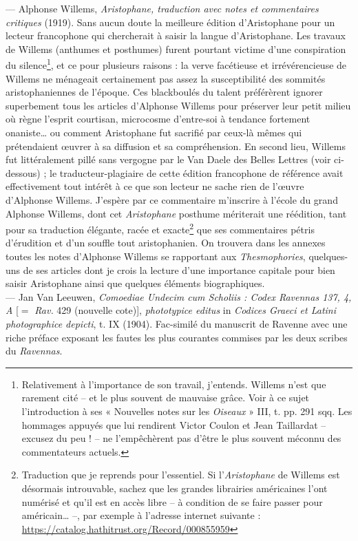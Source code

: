 \documentclass{book}%
\newcommand{\italique}[1]{\textit{#1}}%
\newcommand{\note}[1]{\footnote{#1}}
\begin{document}
--- Alphonse Willems, \italique{Aristophane, traduction avec notes et commentaires critiques} (1919). Sans aucun doute la meilleure édition d’Aristophane pour un lecteur francophone qui chercherait à saisir la langue d’Aristophane. Les travaux de Willems (anthumes et posthumes) furent pourtant victime d'une conspiration du silence\note{Relativement à l'importance de son travail, j'entends. Willems n'est que rarement cité -- et le plus souvent de mauvaise grâce. Voir à ce sujet l'introduction à ses « Nouvelles notes sur les \italique{Oiseaux} » III, t. pp. 291 sqq. Les hommages appuyés que lui rendirent Victor Coulon et Jean Taillardat -- excusez du peu ! -- ne l'empêchèrent pas d'être le plus souvent méconnu des commentateurs actuels.}, et ce pour plusieurs raisons : la verve facétieuse et irrévérencieuse de Willems ne ménageait certainement pas assez la susceptibilité des sommités aristophaniennes de l’époque. Ces blackboulés du talent préférèrent ignorer superbement tous les articles d’Alphonse Willems pour préserver leur petit milieu où règne l’esprit courtisan, microcosme d’entre-soi à tendance fortement onaniste… ou comment Aristophane fut sacrifié par ceux-là mêmes qui prétendaient œuvrer à sa diffusion et sa compréhension. En second lieu, Willems fut littéralement pillé sans vergogne par le Van Daele des Belles Lettres (voir ci-dessous) ; le traducteur-plagiaire de cette édition francophone de référence avait effectivement tout intérêt à ce que son lecteur ne sache rien de l’œuvre d’Alphonse Willems. J’espère par ce commentaire m’inscrire à l’école du grand Alphonse Willems, dont cet \italique{Aristophane} posthume mériterait une réédition, tant pour sa traduction élégante, racée et exacte\note{Traduction que je reprends pour l’essentiel. Si l’\italique{Aristophane} de Willems est désormais introuvable, sachez que les grandes librairies américaines l’ont numérisé et qu’il est en accès libre – à condition de se faire passer pour américain… –, par exemple à l’adresse internet suivante : \href{https://catalog.hathitrust.org/Record/000855959}{https://catalog.hathitrust.org/Record/000855959}} que ses commentaires pétris d’érudition et d’un souffle tout aristophanien. On trouvera dans les annexes toutes les notes d'Alphonse Willems se rapportant aux \italique{Thesmophories}, quelques-uns de ses articles dont je crois la lecture d'une importance capitale pour bien saisir Aristophane ainsi que quelques éléments biographiques.\\


--- Jan Van Leeuwen, \italique{Comoediae Undecim cum Scholiis : Codex Ravennas 137, 4, A} [$=$ \italique{Rav.} 429 (nouvelle cote)], \italique{phototypice editus} in \italique{Codices Graeci et Latini photographice depicti}, t. IX (1904). Fac-similé du manuscrit de Ravenne avec une riche préface exposant les fautes les plus courantes commises par les deux scribes du \italique{Ravennas}.\\
\end{document}
